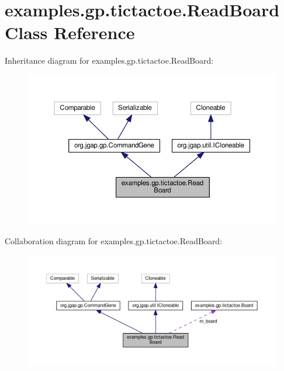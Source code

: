 \hypertarget{classexamples_1_1gp_1_1tictactoe_1_1_read_board}{\section{examples.\-gp.\-tictactoe.\-Read\-Board Class Reference}
\label{classexamples_1_1gp_1_1tictactoe_1_1_read_board}
}


Inheritance diagram for examples.\-gp.\-tictactoe.\-Read\-Board\-:
\nopagebreak
\begin{figure}[H]
\begin{center}
\leavevmode
\includegraphics[width=350pt]{classexamples_1_1gp_1_1tictactoe_1_1_read_board__inherit__graph}
\end{center}
\end{figure}


Collaboration diagram for examples.\-gp.\-tictactoe.\-Read\-Board\-:
\nopagebreak
\begin{figure}[H]
\begin{center}
\leavevmode
\includegraphics[width=350pt]{classexamples_1_1gp_1_1tictactoe_1_1_read_board__coll__graph}
\end{center}
\end{figure}
